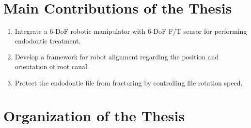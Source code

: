 \section{Main Contributions of the Thesis}
\begin{enumerate}
	\item	Integrate a 6-DoF robotic manipulator with 6-DoF F/T sensor for performing endodontic treatment.
	\item	Develop a framework for robot alignment regarding the position and orientation of root canal. 
	\item	Protect the endodontic file from fracturing by controlling file rotation speed.
\end{enumerate}
\section{Organization of the Thesis}